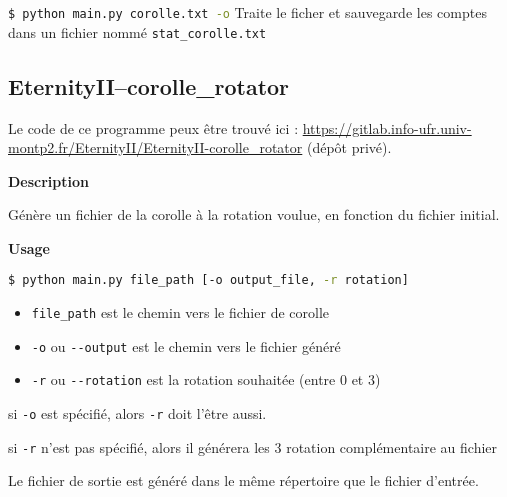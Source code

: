 	\begin{exmp}
		\lstinline[language=bash]|$ python main.py corolle.txt -o|
		Traite le ficher et sauvegarde les comptes dans un fichier nommé \lstinline|stat_corolle.txt|
	\end{exmp}
	
	\subsection{EternityII--corolle\_rotator}
	
	Le code de ce programme peux être trouvé ici : \url{https://gitlab.info-ufr.univ-montp2.fr/EternityII/EternityII-corolle_rotator} (dépôt privé).
	
	\textbf{Description}
	
	Génère un fichier de la corolle à la rotation voulue, en fonction du fichier initial.
	
	\textbf{Usage}
	
	\lstinline[language=bash]|$ python main.py file_path [-o output_file, -r rotation]|
	
	\begin{itemize}
		\item \lstinline|file_path| est le chemin vers le fichier de corolle
		\item \lstinline|-o| ou \lstinline|--output| est le chemin vers le fichier généré
		\item \lstinline|-r| ou \lstinline|--rotation| est la rotation souhaitée (entre 0 et 3)
	\end{itemize}
	
	\begin{rem}
		si \lstinline|-o| est spécifié, alors \lstinline|-r| doit l'être aussi.
	\end{rem}
	\begin{rem}
		si \lstinline|-r| n'est pas spécifié, alors il générera les 3 rotation complémentaire au fichier
	\end{rem}
	
	Le fichier de sortie est généré dans le même répertoire que le fichier d'entrée.